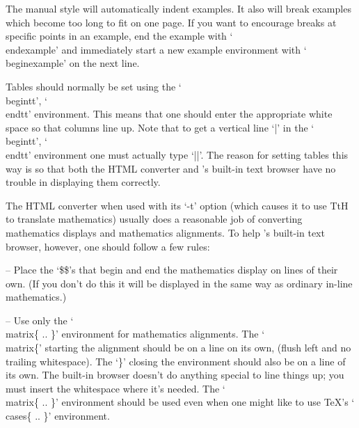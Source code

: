 The manual style will automatically indent examples. It also will break
examples which become too long to fit on one page. If you want to encourage
breaks at specific points in an example, end the example with `\\endexample'
and immediately start a new example environment with `\\beginexample' on
the next line.


\indextt{\\matrix}
Tables  should  normally  be  set  using   the   `\\begintt',   `\\endtt'
environment. This means that one should enter the appropriate white space
so that columns line up. Note that to get a  vertical  line  `|'  in  the
`\\begintt', `\\endtt' environment  one  must  actually  type  `||'.  The
reason for setting tables this way is so that both the HTML converter and
{\GAP}'s built-in  text  browser  have  no  trouble  in  displaying  them
correctly.

The HTML converter when used with its `-t' option (which causes it to use
TtH to translate mathematics) usually does a reasonable job of converting
mathematics  displays  and  mathematics  alignments.  To  help   {\GAP}'s
built-in text browser, however, one should follow a few rules:

\beginlist

\item{--} Place the `\$\$'s that begin and end the mathematics display on
lines of their own. (If you don't do this it will  be  displayed  in  the
same way as ordinary in-line mathematics.)

\item{--} Use only the `\\matrix\{ ..  \}'  environment  for  mathematics
alignments. The `\\matrix\{' starting the alignment should be on  a  line
on its own, (flush left and no trailing whitespace). The `\}' closing the
environment should also be on a line of its  own.  The  built-in  browser
doesn't do anything special to  line  things  up;  you  must  insert  the
whitespace where it's needed. The `\\matrix\{ .. \}'  environment  should
be used even when one might  like  to  use  {\TeX}'s  `\\cases\{  ..  \}'
environment.

